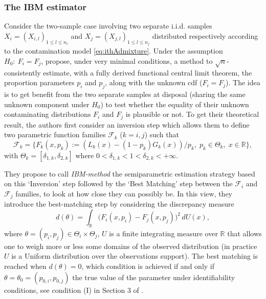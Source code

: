 \subsubsection{The IBM estimator}\label{the-ibm-estimator}

Consider the two-sample case involving two separate i.i.d. samples \(X_i=(X_{i,l})_{1 \leq l \leq n_i}\) and \(X_j=(X_{j,l})_{1 \leq l \leq n_j}\) distributed respectively according to the contamination model \eqref{eq:ithAdmixture}. Under the assumption \(H_0: ~F_i=F_j\), \citet{Milhaud+Pommeret+Salhi+Vandekerkhove:2023} propose, under very minimal conditions, a method to \(\sqrt{n}\)-consistently estimate, with a fully derived functional central limit theorem, the proportion parameters \(p_i\) and \(p_j\), along with the unknown cdf (\(F_i=F_j\)). The idea is to get benefit from the two separate samples at disposal (sharing the same unknown component under \(H_0\)) to test whether the equality of their unknown contaminating distributions \(F_i\) and \(F_j\) is plausible or not. To get their theoretical result, the authors first consider an inversion step which allows them to define two parametric function families \(\mathcal{F}_k\) (\(k=i,j\)) such that
\begin{equation}
  \mathcal{F}_k = \{ F_k(x,p_k) := (L_k(x) - (1-p_k)G_k(x))/p_k, \; p_k \in \Theta_k, \; x \in \mathbb{R} \},
\label{eq:paramFamily}
\end{equation}
with \(\Theta_k = [\delta_{1,k},\delta_{2,k}]\) where \(0 < \delta_{1,k} < 1 < \delta_{2,k} < +\infty\).

They propose to call \emph{IBM-method} the semiparametric estimation strategy based on this `Inversion' step followed by the `Best Matching' step between the \(\mathcal{F}_i\) and \(\mathcal{F}_j\) families, to look at how close they can possibly be. In this view, they introduce the best-matching step by considering the discrepancy measure
\begin{equation}
  d(\theta) = \int_{\mathbb{R}} \big(F_i(x,p_i) - F_j(x,p_j)\big)^2 \, dU(x),
\label{eq:equationd}
\end{equation}
where \(\theta=(p_i,p_j) \in \Theta_i\times \Theta_j\), \(U\) is a finite integrating measure over \(\mathbb R\) that allows one to weigh more or less some domains of the observed distribution (in practice \(U\) is a Uniform distribution over the observations support). The best matching is reached when \(d(\theta) = 0\), which condition is achieved if and only if \(\theta=\theta_0=(p_{0,i},p_{0,j})\) the true value of the parameter under identifiability conditions, see condition (I) in Section 3 of \citet{Milhaud+Pommeret+Salhi+Vandekerkhove:2023}.

